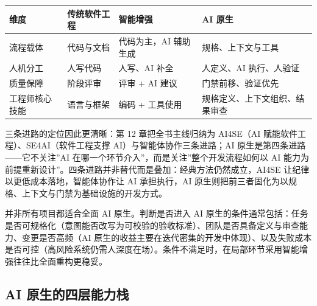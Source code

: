 \documentclass[12pt,a4paper,twoside,openany]{ctexbook}
\numberwithin{figure}{chapter}
\numberwithin{table}{chapter}
\newcounter{none}
\begin{document}
{\def\LTcaptype{none} %
\begin{longtable}[]{@{}
  >{\raggedright\arraybackslash}p{}
  >{\raggedright\arraybackslash}p{}
  >{\raggedright\arraybackslash}p{}
  >{\raggedright\arraybackslash}p{}@{}}
\toprule\noalign{}
\begin{minipage}[b]{\linewidth}\raggedright
维度
\end{minipage} & \begin{minipage}[b]{\linewidth}\raggedright
传统软件工程
\end{minipage} & \begin{minipage}[b]{\linewidth}\raggedright
智能增强
\end{minipage} & \begin{minipage}[b]{\linewidth}\raggedright
AI 原生
\end{minipage} \\
\midrule\noalign{}
\endhead
\bottomrule\noalign{}
\endlastfoot
流程载体 & 代码与文档 & 代码为主，AI 辅助生成 & 规格、上下文与工具 \\
人机分工 & 人写代码 & 人写、AI 补全 & 人定义、AI 执行、人验证 \\
质量保障 & 阶段评审 & 评审 + AI 建议 & 门禁前移、验证优先 \\
工程师核心技能 & 语言与框架 & 编码 + 工具使用 &
规格定义、上下文组织、结果审查 \\
\end{longtable}
}

三条进路的定位因此更清晰：第 12 章把全书主线归纳为 AI4SE（AI
赋能软件工程）、SE4AI（软件工程支撑 AI）与智能体协作三条进路；AI
原生是第四条进路------它不关注''AI
在哪一个环节介入''，而是关注''整个开发流程如何以 AI
能力为前提重新设计''。四条进路并非替代而是叠加：经典方法仍然成立，AI4SE
让纪律以更低成本落地，智能体协作让 AI 承担执行，AI
原生则把前三者固化为以规格、上下文与门禁为基础设施的开发方式。

并非所有项目都适合全面 AI 原生。判断是否进入 AI
原生的条件通常包括：任务是否可规格化（意图能否改写为可校验的验收标准）、团队是否具备定义与审查能力、变更是否高频（AI
原生的收益主要在迭代密集的开发中体现）、以及失败成本是否可控（高风险系统仍需人深度在场）。条件不满足时，在局部环节采用智能增强往往比全面重构更稳妥。

\subsection{AI
原生的四层能力栈}\label{ai-ux539fux751fux7684ux56dbux5c42ux80fdux529bux6808}
\end{document}
